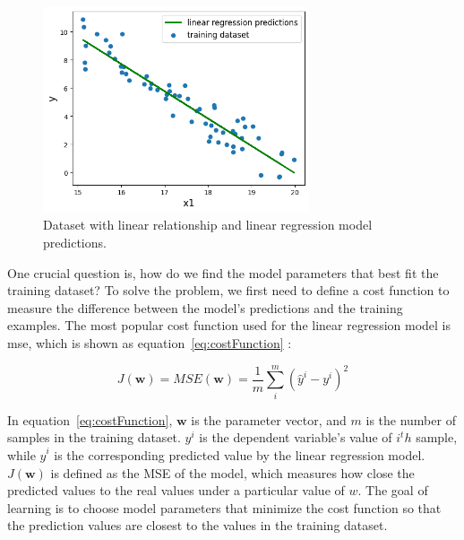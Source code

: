 \documentclass[english]{kththesis}
\begin{document}
\begin{figure}[!ht]
    \centering
    \includegraphics[width=0.7\textwidth]{linear_regression.png}
    \caption{Dataset with linear relationship and linear regression model predictions.}
    \label{fig:linearRegression}
\end{figure}

One crucial question is, how do we find the model parameters that best fit the training dataset? To solve the problem, we first need to define a cost function to measure the difference between the model’s predictions and the training examples. The most popular cost function used for the linear regression model is \gls{mse}, which is shown as equation~\ref{eq:costFunction} \cite{geron_handson_ml}:

\begin{equation}
J(\mathbf{w})=MSE(\mathbf{w})=\frac{1}{m}\sum_{i}^{m}(\hat{y}^{i}-y^{i})^{2}
\label{eq:costFunction}
\end{equation}

In equation~\ref{eq:costFunction}, $\mathbf{w}$ is the parameter vector, and $m$ is the number of samples in the training dataset. $y^i$ is the dependent variable's value of $i^th$ sample, while $\hat{y}^{i}$ is the corresponding predicted value by the linear regression model. $J(\mathbf{w})$ is defined as the MSE of the model, which measures how close the predicted values to the real values under a particular value of $w$. The goal of learning is to choose model parameters that minimize the cost function so that the prediction values are closest to the values in the training dataset.
\end{document}
